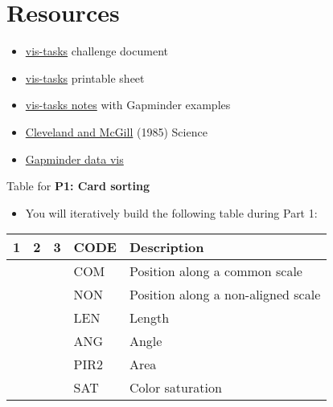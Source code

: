 \documentclass[11pt]{article}
\begin{document}
\section{Resources}
\label{sec:org65390cc}
\begin{itemize}
\item \href{https://github.com/zdelrosario/teaching-eda/blob/master/viz\_tasks/challenge.md}{vis-tasks} challenge document
\item \href{https://github.com/zdelrosario/teaching-eda/blob/master/viz\_tasks/grid.pdf}{vis-tasks} printable sheet
\item \href{https://citrineinformatics.github.io/ga-tech-workshop/04-vis-principles/index.html}{vis-tasks notes} with Gapminder examples
\item \href{https://ils.unc.edu/courses/2015\_spring/inls541\_001/Readings/Cleveland\%20and\%20McGill\%201985\%20-\%20Graphical\%20Perception\%20and\%20Cleveland1985-Graphical\%20Methods\%20for\%20Analyzing\%20Scientific\%20Data.pdf}{Cleveland and McGill} (1985) Science
\item \href{https://www.gapminder.org/tools/\#\$chart-type=bubbles}{Gapminder data vis}
\end{itemize}

Table for \textbf{P1: Card sorting}
\begin{itemize}
\item You will iteratively build the following table during Part 1:
\end{itemize}

\begin{center}
\begin{tabular}{rrrll}
1 & 2 & 3 & CODE & Description\\
\hline
 &  &  & COM & Position along a common scale\\
 &  &  & NON & Position along a non-aligned scale\\
 &  &  & LEN & Length\\
 &  &  & ANG & Angle\\
 &  &  & PIR2 & Area\\
 &  &  & SAT & Color saturation\\
\end{tabular}
\end{center}
\end{document}
